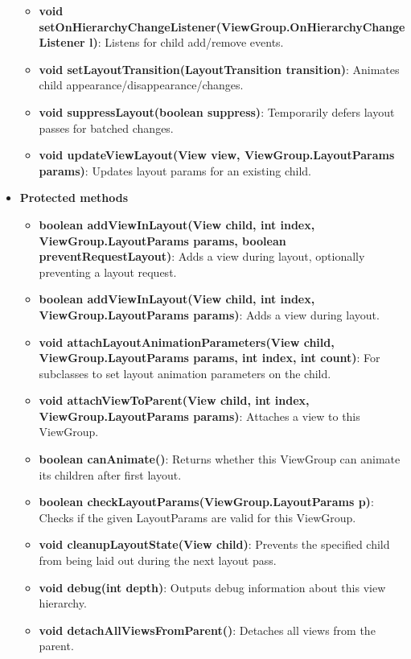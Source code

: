 \documentclass{report}
\begin{document}
\begin{itemize}
\begin{itemize}
                \item \textbf{void setOnHierarchyChangeListener(ViewGroup.OnHierarchyChangeListener l)}: Listens for child add/remove events.
                \item \textbf{void setLayoutTransition(LayoutTransition transition)}: Animates child appearance/disappearance/changes.
                \item \textbf{void suppressLayout(boolean suppress)}: Temporarily defers layout passes for batched changes.
                \item \textbf{void updateViewLayout(View view, ViewGroup.LayoutParams params)}: Updates layout params for an existing child.
            \end{itemize}

        \item \textbf{Protected methods}
            \begin{itemize}
                \item \textbf{boolean addViewInLayout(View child, int index, ViewGroup.LayoutParams params, boolean preventRequestLayout)}: Adds a view during layout, optionally preventing a layout request.
                \item \textbf{boolean addViewInLayout(View child, int index, ViewGroup.LayoutParams params)}: Adds a view during layout.
                \item \textbf{void attachLayoutAnimationParameters(View child, ViewGroup.LayoutParams params, int index, int count)}: For subclasses to set layout animation parameters on the child.
                \item \textbf{void attachViewToParent(View child, int index, ViewGroup.LayoutParams params)}: Attaches a view to this ViewGroup.
                \item \textbf{boolean canAnimate()}: Returns whether this ViewGroup can animate its children after first layout.
                \item \textbf{boolean checkLayoutParams(ViewGroup.LayoutParams p)}: Checks if the given LayoutParams are valid for this ViewGroup.
                \item \textbf{void cleanupLayoutState(View child)}: Prevents the specified child from being laid out during the next layout pass.
                \item \textbf{void debug(int depth)}: Outputs debug information about this view hierarchy.
                \item \textbf{void detachAllViewsFromParent()}: Detaches all views from the parent.

\end{itemize}
\end{itemize}
\end{document}
